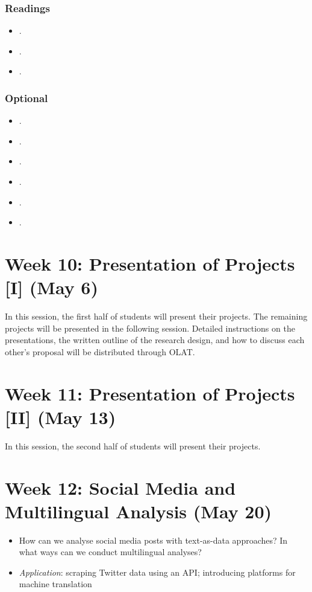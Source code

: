 \documentclass[abstract=on,parskip=full,headings=standardclasses,fontsize=11pt,paper=a4]{scrartcl}
\begin{document}
\subsubsection*{Readings}
\begin{itemize}
\item {}.
\item {}.
\item {}.
\end{itemize}


\subsubsection*{Optional}
\begin{itemize}
\item {}.
\item {}.
\item {}.
\item {}.
\item {}.
\item {}.
\end{itemize}

\section{Week 10: Presentation of Projects [I] (May 6)}

In this session, the first half of students will present their projects. The remaining projects will be presented in the following session. Detailed instructions on the presentations, the written outline of the research design, and how to discuss each other's proposal will be distributed through OLAT.


\section{Week 11: Presentation of Projects [II] (May 13)}

In this session, the second half of students will present their projects. 



\section{Week 12: Social Media and Multilingual Analysis (May 20)}

\begin{itemize}
\renewcommand\labelitemi{--}
\item How can we analyse social media posts with text-as-data approaches? In what ways can we conduct multilingual analyses? 
\item \textit{Application}: scraping Twitter data using an API; introducing platforms for machine translation
\end{itemize}
\end{document}
